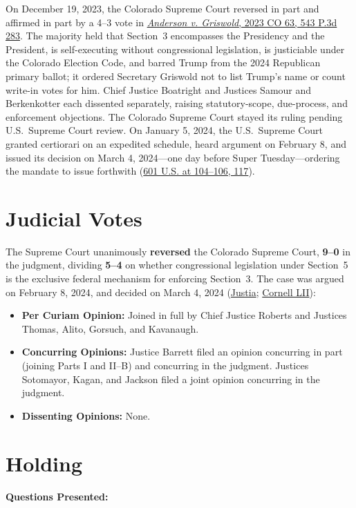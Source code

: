\documentclass[12pt]{article}
\begin{document}
On December 19, 2023, the Colorado Supreme Court reversed in part and affirmed in part by a 4--3 vote in \href{https://law.justia.com/cases/colorado/supreme-court/2023/23sa300.html}{\emph{Anderson v. Griswold}, 2023 CO 63, 543 P.3d 283}. The majority held that Section~3 encompasses the Presidency and the President, is self-executing without congressional legislation, is justiciable under the Colorado Election Code, and barred Trump from the 2024 Republican primary ballot; it ordered Secretary Griswold not to list Trump's name or count write-in votes for him. Chief Justice Boatright and Justices Samour and Berkenkotter each dissented separately, raising statutory-scope, due-process, and enforcement objections. The Colorado Supreme Court stayed its ruling pending U.S.\ Supreme Court review. On January 5, 2024, the U.S.\ Supreme Court granted certiorari on an expedited schedule, heard argument on February 8, and issued its decision on March 4, 2024---one day before Super Tuesday---ordering the mandate to issue forthwith (\href{https://www.supremecourt.gov/opinions/23pdf/601us1r06_m6hn.pdf}{601 U.S. at 104--106, 117}).

\section{Judicial Votes}
The Supreme Court unanimously \textbf{reversed} the Colorado Supreme Court, \textbf{9--0} in the judgment, dividing \textbf{5--4} on whether congressional legislation under Section~5 is the exclusive federal mechanism for enforcing Section~3. The case was argued on February 8, 2024, and decided on March 4, 2024 (\href{https://supreme.justia.com/cases/federal/us/601/23-719/}{Justia}; \href{https://www.law.cornell.edu/supremecourt/text/23-719}{Cornell LII}):

\begin{itemize}
    \item \textbf{Per Curiam Opinion:} Joined in full by Chief Justice Roberts and Justices Thomas, Alito, Gorsuch, and Kavanaugh.
    \item \textbf{Concurring Opinions:} Justice Barrett filed an opinion concurring in part (joining Parts I and II--B) and concurring in the judgment. Justices Sotomayor, Kagan, and Jackson filed a joint opinion concurring in the judgment.
    \item \textbf{Dissenting Opinions:} None.
\end{itemize}

\section{Holding}
\textbf{Questions Presented:}
\end{document}
